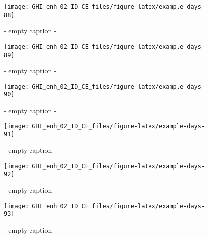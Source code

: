 \documentclass[
  10pt,
  a4paper,oneside]{article}
\begin{document}
\begin{figure}[H]

{\centering \texttt{[image: GHI\_enh\_02\_ID\_CE\_files/figure-latex/example-days-88]} 

}

\caption{ - empty caption - }\label{fig:example-days-88}
\end{figure}

\begin{figure}[H]

{\centering \texttt{[image: GHI\_enh\_02\_ID\_CE\_files/figure-latex/example-days-89]} 

}

\caption{ - empty caption - }\label{fig:example-days-89}
\end{figure}

\begin{figure}[H]

{\centering \texttt{[image: GHI\_enh\_02\_ID\_CE\_files/figure-latex/example-days-90]} 

}

\caption{ - empty caption - }\label{fig:example-days-90}
\end{figure}

\begin{figure}[H]

{\centering \texttt{[image: GHI\_enh\_02\_ID\_CE\_files/figure-latex/example-days-91]} 

}

\caption{ - empty caption - }\label{fig:example-days-91}
\end{figure}

\begin{figure}[H]

{\centering \texttt{[image: GHI\_enh\_02\_ID\_CE\_files/figure-latex/example-days-92]} 

}

\caption{ - empty caption - }\label{fig:example-days-92}
\end{figure}

\begin{figure}[H]

{\centering \texttt{[image: GHI\_enh\_02\_ID\_CE\_files/figure-latex/example-days-93]} 

}

\caption{ - empty caption - }\label{fig:example-days-93}
\end{figure}
\end{document}
